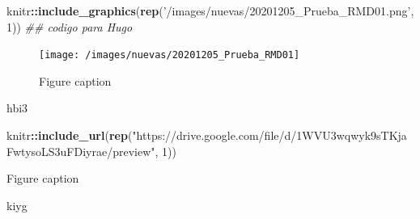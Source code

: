\documentclass[]{article}
\newenvironment{Shaded}{\begin{snugshade}}{\end{snugshade}}
\newcommand{\CommentTok}[1]{\textcolor[rgb]{0.56,0.35,0.01}{\textit{#1}}}
\newcommand{\DecValTok}[1]{\textcolor[rgb]{0.00,0.00,0.81}{#1}}
\newcommand{\KeywordTok}[1]{\textcolor[rgb]{0.13,0.29,0.53}{\textbf{#1}}}
\newcommand{\NormalTok}[1]{#1}
\newcommand{\OperatorTok}[1]{\textcolor[rgb]{0.81,0.36,0.00}{\textbf{#1}}}
\newcommand{\StringTok}[1]{\textcolor[rgb]{0.31,0.60,0.02}{#1}}
\begin{document}
\begin{Shaded}
\begin{Highlighting}[]
\NormalTok{knitr}\OperatorTok{::}\KeywordTok{include_graphics}\NormalTok{(}\KeywordTok{rep}\NormalTok{(}\StringTok{'/images/nuevas/20201205_Prueba_RMD01.png'}\NormalTok{, }\DecValTok{1}\NormalTok{)) }\CommentTok{## codigo para Hugo}
\end{Highlighting}
\end{Shaded}

\begin{figure}

{\centering \texttt{[image: /images/nuevas/20201205\_Prueba\_RMD01]} 

}

\caption{Figure caption}\label{fig:Figure01}
\end{figure}

hbi3

\begin{Shaded}
\begin{Highlighting}[]
\NormalTok{knitr}\OperatorTok{::}\KeywordTok{include_url}\NormalTok{(}\KeywordTok{rep}\NormalTok{(}\StringTok{"https://drive.google.com/file/d/1WVU3wqwyk9sTKjaFwtysoLS3uFDiyrae/preview"}\NormalTok{, }\DecValTok{1}\NormalTok{))}
\end{Highlighting}
\end{Shaded}

Figure caption

kiyg
\end{document}
